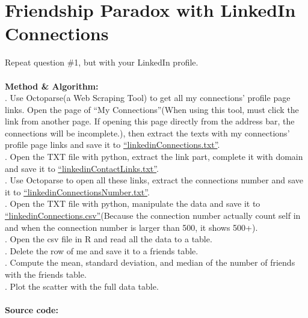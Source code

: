 \documentclass{article}
\begin{document}
		\section{Friendship Paradox with LinkedIn Connections}
		Repeat question \#1, but with your LinkedIn profile.\\\\
		\textbf{Method \& Algorithm:}\\
		. Use Octoparse(a Web Scraping Tool) to get all my connections' profile page links. Open the page of ``My Connections''(When using this tool, must click the link from another page. If opening this page directly from the address bar, the connections will be incomplete.), then extract the texts with my connections' profile page links and save it to \href{https://github.com/zhangboroy/cs532-s17/blob/master/assg04_submission/linkedinConnections.txt}{``linkedinConnections.txt''}.\\
		. Open the TXT file with python, extract the link part, complete it with domain and save it to \href{https://github.com/zhangboroy/cs532-s17/blob/master/assg04_submission/linkedinContactLinks.txt}{``linkedinContactLinks.txt''}.\\
		. Use Octoparse to open all these links, extract the connections number and save it to \href{https://github.com/zhangboroy/cs532-s17/blob/master/assg04_submission/linkedinConnectionsNumber.txt}{``linkedinConnectionsNumber.txt''}.\\
		. Open the TXT file with python, manipulate the data and save it to \href{https://github.com/zhangboroy/cs532-s17/blob/master/assg04_submission/linkedinConnections.csv}{``linkedinConnections.csv''}(Because the connection number actually count self in and when the connection number is larger than 500, it shows 500+).\\
		. Open the csv file in R and read all the data to a table.\\
		. Delete the row of me and save it to a friends table.\\
		. Compute the mean, standard deviation, and median of the number of friends with the friends table.\\
		. Plot the scatter with the full data table.\\\\
		\textbf{Source code:}
		
		
		
\end{document}
